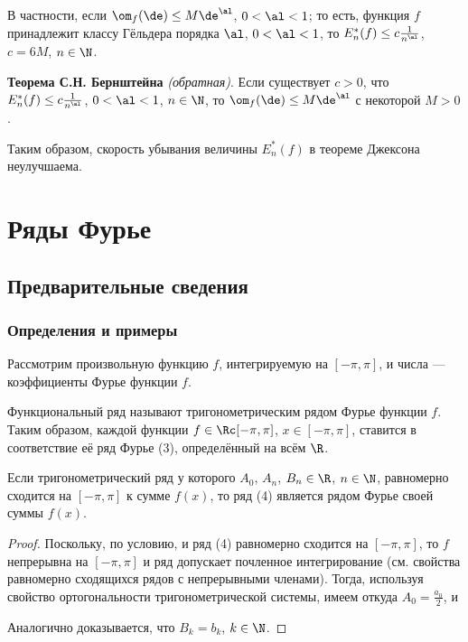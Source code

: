 \documentclass[a4paper]{article}
\begin{document}
В частности, если $\om_f(\de) \le M\de^{\al}$, $0 < \al<1$; то есть,
функция $f$ принадлежит классу Гёльдера порядка $\al$, $0<\al<1$, то
$E^*_n(f) \le c \frac1{n^{\al}}$, $c=6M$, $n\in\N$.

\textbf{Теорема С.Н. Бернштейна} \emph{(обратная)}. Если существует
$c>0$, что $E^*_n(f) \le c \frac1{n^{\al}}$, $0<\al<1$, $n\in\N$, то
$\om_f(\de) \le M\de^{\al}$ с некоторой $M>0$.

Таким образом, скорость убывания величины $E^*_n(f)$ в теореме
Джексона неулучшаема.

\pagebreak
\section{Ряды Фурье}
\subsection{Предварительные сведения}
\subsubsection{Определения и примеры}

Рассмотрим произвольную функцию $f$, интегрируемую на $[-\pi,\pi]$,
и числа   --- коэффициенты
Фурье функции $f$.

Функциональный ряд  называют тригонометрическим рядом Фурье
функции $f$. Таким образом, каждой функции $f\in\Rc[-\pi,\pi]$,
$x\in[-\pi,\pi]$, ставится в соответствие её ряд Фурье (3),
определённый на всём $\R$.

\begin{stm}
Если тригонометрический ряд  у которого $A_0$, $A_n$, $B_n\in\R$, $n\in\N$,
равномерно сходится на $[-\pi,\pi]$ к сумме $f(x)$, то ряд (4)
является рядом Фурье своей суммы $f(x)$.
\end{stm}

\begin{proof}
Поскольку, по условию,  и ряд (4) равномерно сходится на
$[-\pi,\pi]$, то $f$ непрерывна на $[-\pi,\pi]$ и ряд допускает
почленное интегрирование (см. свойства равномерно сходящихся рядов с
непрерывными членами). Тогда, используя свойство ортогональности
тригонометрической системы, имеем  откуда $A_0 = \frac{a_0}2$, и 

Аналогично доказывается, что $B_k=b_k$, $k\in\N$.
\end{proof}
\end{document}
